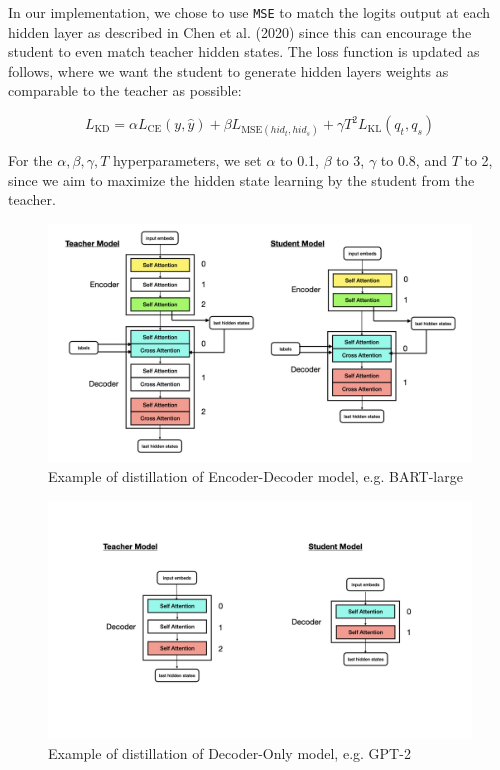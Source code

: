 \documentclass{article}
\begin{document}
    \hspace*{1em} In our implementation, we chose to use \texttt{MSE} to match the logits output at each hidden layer as described in Chen et al. (2020)\cite{chen2020simple} since this can encourage the student to even match teacher hidden states. The loss function is updated as follows, where we want the student to generate hidden layers weights as comparable to the teacher as possible:

    \begin{equation}
        L_{\text{KD}} = \alpha L_{\text{CE}}(y, \hat{y}) + \beta L_{\text{MSE}(hid_t, hid_s)} + \gamma T^2 L_{\text{KL}}(q_t, q_s)
    \end{equation}

    \hspace*{1em} For the $\alpha, \beta, \gamma, T$ hyperparameters, we set $\alpha$ to 0.1, $\beta$ to 3, $\gamma$ to 0.8, and $T$ to 2, since we aim to maximize the hidden state learning by the student from the teacher.

    \begin{figure}[hbpt]
        \centering
        \includegraphics[width=1\textwidth]{pics/pa/0.001}
        \caption{Example of distillation of Encoder-Decoder model, e.g. BART-large}
        \label{fig:sub1}
    \end{figure}

    \begin{figure}[hbpt]
        \centering
        \includegraphics[width=1\textwidth]{pics/pa/0.002}
        \caption{Example of distillation of Decoder-Only model, e.g. GPT-2}
        \label{fig:sub2}
    \end{figure}
\end{document}
